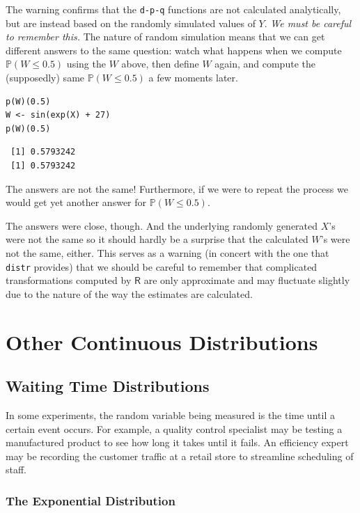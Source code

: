 \documentclass[captions=tableheading]{scrbook}
\begin{document}
The warning confirms that the \texttt{d-p-q} functions are not calculated analytically, but are instead based on the randomly simulated values of \(Y\). \emph{We must be careful to remember this.} The nature of random simulation means that we can get different answers to the same question: watch what happens when we compute \(\mathbb{P}(W\leq0.5)\) using the \(W\) above, then define \(W\) again, and compute the (supposedly) same \(\mathbb{P}(W\leq0.5)\) a few moments later.


\lstset{language=R}
\begin{lstlisting}
p(W)(0.5)
W <- sin(exp(X) + 27)
p(W)(0.5)
\end{lstlisting}

\begin{verbatim}
 [1] 0.5793242
 [1] 0.5793242
\end{verbatim}

The answers are not the same! Furthermore, if we were to repeat the process we would get yet another answer for \(\mathbb{P}(W\leq0.5)\).  

The answers were close, though. And the underlying randomly generated \(X\)'s were not the same so it should hardly be a surprise that the calculated \(W\)'s were not the same, either. This serves as a warning (in concert with the one that \texttt{distr} provides) that we should be careful to remember that complicated transformations computed by \(\mathsf{R}\) are only approximate and may fluctuate slightly due to the nature of the way the estimates are calculated.
\section{Other Continuous Distributions}
\label{sec-1-5}
\label{sec-Other-Continuous-Distributions}
\subsection{Waiting Time Distributions}
\label{sec-1-5-1}
\label{sub-Waiting-Time-Distributions}


In some experiments, the random variable being measured is the time until a certain event occurs. For example, a quality control specialist may be testing a manufactured product to see how long it takes until it fails. An efficiency expert may be recording the customer traffic at a retail store to streamline scheduling of staff. 
\subsubsection{The Exponential Distribution}
\label{sec-1-5-1-1}
\label{sub-The-Exponential-Distribution}
\end{document}
